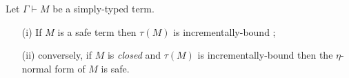

\begin{lem}
\label{lem:safe_imp_incrbound} Let $\Gamma \vdash M$ be a
simply-typed term.
\begin{itemize}
\item[(i)] If $M$ is a safe term then $\tau(M)$ is incrementally-bound ;
\item[(ii)] conversely, if $M$ is \emph{closed} and $\tau(M)$ is incrementally-bound then the $\eta$-normal form of $M$ is safe.
\end{itemize}
\end{lem}
